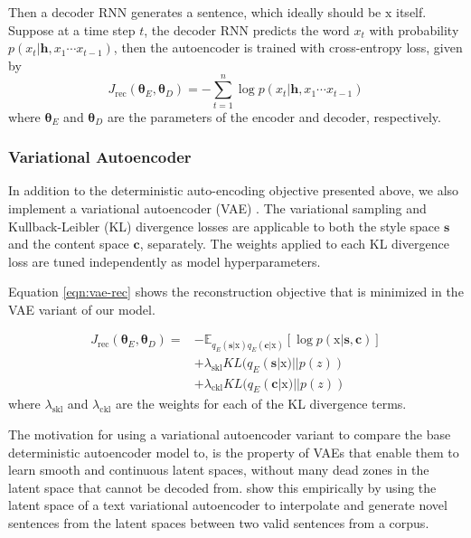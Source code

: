 \documentclass[11pt,a4paper]{article}
\newcommand{\rmx}{\mathrm x}
\newcommand{\loss}[1]{J_\text{#1}}
\begin{document}
Then a decoder RNN generates a sentence, which ideally should be $\rmx$ itself. Suppose at a time step $t$, the decoder RNN predicts the word $x_t$ with probability $p(x_t|\bm h, x_1\cdots x_{t-1})$, then the autoencoder is trained with cross-entropy loss, given by
\begin{equation}
	\loss{rec}(\bm\theta_E,\bm\theta_D)= -\sum_{t=1}^n \log p(x_t|\bm h, x_1\cdots x_{t-1})
\end{equation}
where $\bm\theta_E$ and $\bm\theta_D$ are the parameters of the encoder and decoder, respectively.

\subsubsection{Variational Autoencoder}

In addition to the deterministic auto-encoding objective presented above, we also implement a variational autoencoder (VAE) \cite{kingma2013auto}. The variational sampling and Kullback-Leibler (KL) divergence \citep{kullback1951information} losses are applicable to both the style space $\bm s$ and the content space $\bm c$, separately. The weights applied to each KL divergence loss are tuned independently as model hyperparameters.

Equation \ref{eqn:vae-rec} shows the reconstruction objective that is minimized in the VAE variant of our model.

\begin{align} \label{eqn:vae-rec}
	\loss{rec}(\bm\theta_E, \bm\theta_D) = \nonumber
	 & - \mathbb{E}_{q_{E}(\bm s|\rmx) q_{E}(\bm c|\rmx)} [\log p(\rmx|\bm s, \bm c)] \nonumber \\
	 & + \lambda_{\text{skl}} KL(q_{E}(\bm s|\rmx)||p(z)) \nonumber                             \\
	 & + \lambda_{\text{ckl}} KL(q_{E}(\bm c|\rmx)||p(z))
\end{align}
where $\lambda_{\text{skl}}$ and $\lambda_{\text{ckl}}$ are the weights for each of the KL divergence terms.

The motivation for using a variational autoencoder variant to compare the base deterministic autoencoder model to, is the property of VAEs that enable them to learn smooth and continuous latent spaces, without many dead zones in the latent space that cannot be decoded from. \citet{bowman2016generating} show this empirically by using the latent space of a text variational autoencoder to interpolate and generate novel sentences from the latent spaces between two valid sentences from a corpus.
\end{document}

